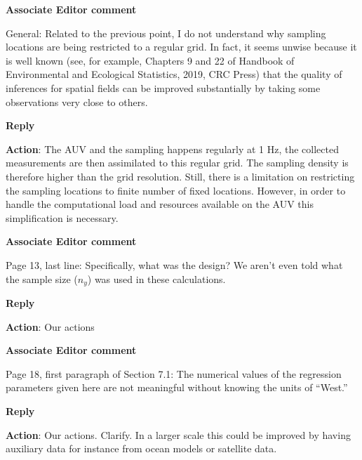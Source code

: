 \documentclass[a4paper]{article}
\def\aecom{\textbf{Associate Editor comment}}
\def\reply{\textbf{Reply}}
\def\action{\textbf{Action}}
\begin{document}
\vspace{5mm}
\noindent \aecom 

General: Related to the previous point, I do not understand why sampling locations are being restricted to a regular grid. In fact, it seems unwise because it is well known (see, for example, Chapters 9 and 22 of Handbook of Environmental and Ecological Statistics, 2019, CRC Press) that the quality of inferences for spatial fields can be improved substantially by taking some
observations very close to others.\par

\reply

\action: The AUV and the sampling happens regularly at 1 Hz, the collected measurements are then assimilated to this regular grid. The sampling density is therefore higher than the grid resolution. Still, there is a limitation on restricting the sampling locations to finite number of fixed locations. However, in order to handle the computational load and resources available on the AUV this simplification is necessary. %
\vspace{1em}

\vspace{5mm}
\noindent \aecom 

Page 13, last line: Specifically, what was the design? We aren’t even told what the sample size ($n_y$) was used in these calculations.\par

\reply

\action: Our actions
\vspace{1em}

\vspace{5mm}
\noindent \aecom 

Page 18, first paragraph of Section 7.1: The numerical values of the regression parameters given here are not meaningful without knowing the units of “West.”\par

\reply

\action: Our actions. Clarify. In a larger scale this could be improved by having auxiliary data for instance from ocean models or satellite data.

\vspace{1em}
\end{document}
